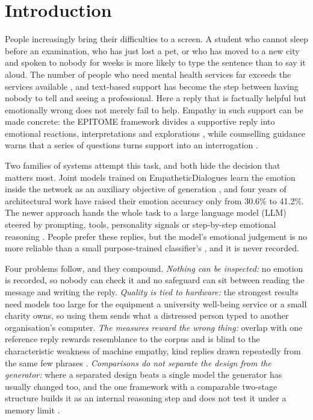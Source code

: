 \section{Introduction}
People increasingly bring their difficulties to a screen. A student who cannot sleep before an examination, who has just lost a pet, or who has moved to a new city and spoken to nobody for weeks is more likely to type the sentence than to say it aloud. The number of people who need mental health services far exceeds the services available \cite{who2022report}, and text-based support has become the step between having nobody to tell and seeing a professional. Here a reply that is factually helpful but emotionally wrong does not merely fail to help. Empathy in such support can be made concrete: the EPITOME framework divides a supportive reply into emotional reactions, interpretations and explorations \cite{sharma2020epitome}, while counselling guidance warns that a series of questions turns support into an interrogation \cite{samhsa2019tip35}.

Two families of systems attempt this task, and both hide the decision that matters most. Joint models trained on EmpatheticDialogues learn the emotion inside the network as an auxiliary objective of generation \cite{lin2019moel, majumder2020mime, li2020empdg, li2022kemp, sabour2022cem, zhou2023case, yang2023escm}, and four years of architectural work have raised their emotion accuracy only from 30.6\% to 41.2\%. The newer approach hands the whole task to a large language model (LLM) steered by prompting, tools, personality signals or step-by-step emotional reasoning \cite{qian2023llm, loh2023harnessing, cao2025tooled, wu2025traits, li2024emotioncot}. People prefer these replies, but the model's emotional judgement is no more reliable than a small purpose-trained classifier's \cite{feng2023affect, belay2025}, and it is never recorded.

Four problems follow, and they compound. \textit{Nothing can be inspected:} no emotion is recorded, so nobody can check it and no safeguard can sit between reading the message and writing the reply. \textit{Quality is tied to hardware:} the strongest results need models too large for the equipment a university well-being service or a small charity owns, so using them sends what a distressed person typed to another organisation's computer. \textit{The measures reward the wrong thing:} overlap with one reference reply rewards resemblance to the corpus and is blind to the characteristic weakness of machine empathy, kind replies drawn repeatedly from the same few phrases \cite{sorin2024jmir}. \textit{Comparisons do not separate the design from the generator:} where a separated design beats a single model the generator has usually changed too, and the one framework with a comparable two-stage structure builds it as an internal reasoning step and does not test it under a memory limit \cite{yang2024hef}.

